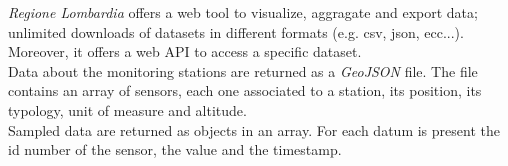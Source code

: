 \textit{Regione Lombardia} offers a web tool to visualize, aggragate and export data; unlimited downloads of datasets in different formats (e.g. csv, json, ecc...).
Moreover, it offers a web API to access a specific dataset.\\

Data about the monitoring stations are returned as a \textit{GeoJSON} file. The file contains an array of sensors, each one associated to a station, its position, its typology, unit of measure and altitude.\\

Sampled data are returned as objects in an array. For each datum is present the id number of the sensor, the value and the timestamp.
